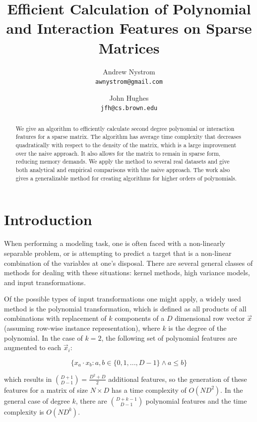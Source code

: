 \documentclass[11pt,twocolumn]{article}
\begin{document}
\title{Efficient Calculation of Polynomial and Interaction Features on Sparse Matrices}
\author{
  Andrew Nystrom\\
  \texttt{awnystrom@gmail.com}
  \and
  John Hughes\\
  \texttt{jfh@cs.brown.edu}
}
\date{}

\maketitle

\begin{abstract}%
We give an algorithm to efficiently calculate second degree polynomial or interaction features for a sparse matrix.
The algorithm has average time complexity that decreases quadratically with respect to the density of the matrix, which
is a large improvement over the naive approach. It also allows for the matrix to remain in sparse form, reducing memory demands.
We apply the method to several real datasets and give both analytical and empirical comparisons with the
naive approach. The work also gives a generalizable method for creating algorithms for higher orders of polynomials.
\end{abstract}

\section{Introduction}
When performing a modeling task, one is often faced with a non-linearly separable problem,
or is attempting to predict a target that is a non-linear combination of the variables at one's disposal.
There are several general classes of methods for dealing with these situations: kernel methods, 
high variance models, and input transformations.

Of the possible types of input transformations one
might apply, a widely used method is the polynomial transformation, which is defined as 
all products of all combinations with replacement of $k$ components of a $D$ dimensional row vector $\vec{x}$ (assuming row-wise instance representation), where $k$ is the degree of the polynomial.
In the case of $k=2$, the following set of polynomial features are augmented to each $\vec{x}_i$:

\begin{equation*}
\{x_a \cdot x_b : a, b \in \{0,1,..., D-1\} \land a \le b\}
\end{equation*}

which results in $\binom{D+1}{D-1} = \frac{D^2+D}{2}$ additional features, so the generation of 
these features for a matrix of size $N \times D$ has a time complexity of $O(ND^2)$. In the general case of degree $k$, there 
are $\binom{D+k-1}{D-1}$ polynomial features and the time complexity is $O(ND^k)$.
\end{document}
